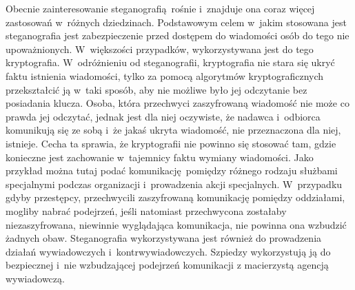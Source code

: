 \documentclass[a4paper, twoside, openright, 12pt]{report}
\begin{document}
        Obecnie zainteresowanie steganografią rośnie i~znajduje ona coraz więcej
        zastosowań w~różnych dziedzinach. Podstawowym celem w~jakim stosowana jest
        steganografia jest zabezpieczenie przed dostępem do wiadomości osób do tego nie
        upoważnionych. W~większości przypadków, wykorzystywana jest do tego
        kryptografia. W~odróżnieniu od steganografii, kryptografia nie stara się
        ukryć faktu istnienia wiadomości, tylko za pomocą algorytmów kryptograficznych
        przekształcić ją w~taki sposób, aby nie możliwe było jej odczytanie bez posiadania
        klucza. Osoba, która przechwyci zaszyfrowaną wiadomość nie może co prawda jej
        odczytać, jednak jest dla niej oczywiste, że nadawca i~odbiorca
        komunikują się ze sobą i~że jakaś ukryta wiadomość, nie przeznaczona dla niej,
        istnieje\cite{DIGITALWATERMARKING}. Cecha ta sprawia, że kryptografii nie
        powinno się stosować tam, gdzie konieczne jest zachowanie w~tajemnicy
        faktu wymiany wiadomości. Jako przykład
        można tutaj podać komunikację pomiędzy różnego rodzaju służbami specjalnymi
        podczas organizacji i~prowadzenia akcji specjalnych.
        W~przypadku gdyby przestępcy, przechwycili zaszyfrowaną komunikację
        pomiędzy oddziałami, mogliby nabrać podejrzeń, jeśli natomiast przechwycona
        zostałaby niezaszyfrowana, niewinnie wyglądająca komunikacja, nie powinna ona
        wzbudzić żadnych obaw. Steganografia wykorzystywana jest również do prowadzenia
        działań wywiadowczych i~kontrwywiadowczych. Szpiedzy wykorzystują ją do
        bezpiecznej i~nie wzbudzającej podejrzeń komunikacji z macierzystą agencją
        wywiadowczą.
\end{document}
